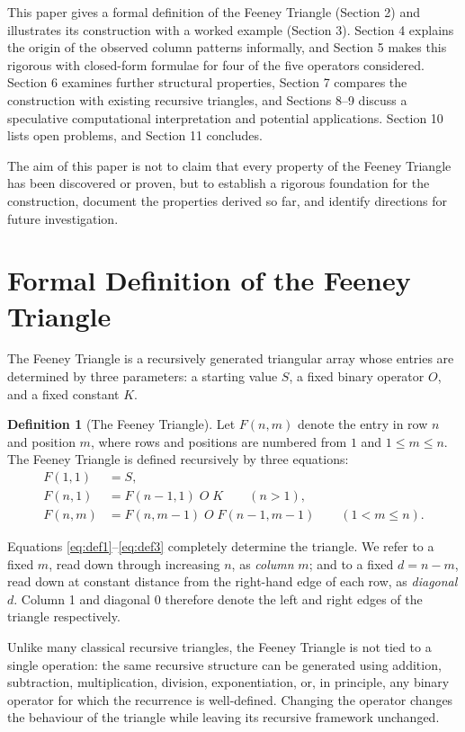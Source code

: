 \documentclass[11pt]{article}
\theoremstyle{definition}
\newtheorem{definition}{Definition}[section]
\begin{document}
This paper gives a formal definition of the Feeney Triangle (Section 2) and illustrates its construction with a worked example (Section 3). Section 4 explains the origin of the observed column patterns informally, and Section 5 makes this rigorous with closed-form formulae for four of the five operators considered. Section 6 examines further structural properties, Section 7 compares the construction with existing recursive triangles, and Sections 8--9 discuss a speculative computational interpretation and potential applications. Section 10 lists open problems, and Section 11 concludes.

The aim of this paper is not to claim that every property of the Feeney Triangle has been discovered or proven, but to establish a rigorous foundation for the construction, document the properties derived so far, and identify directions for future investigation.

\section{Formal Definition of the Feeney Triangle}

The Feeney Triangle is a recursively generated triangular array whose entries are determined by three parameters: a starting value $S$, a fixed binary operator $O$, and a fixed constant $K$.

\begin{definition}[The Feeney Triangle]
Let $F(n,m)$ denote the entry in row $n$ and position $m$, where rows and positions are numbered from $1$ and $1 \le m \le n$. The Feeney Triangle is defined recursively by three equations:
\begin{align}
F(1,1) &= S, \label{eq:def1}\\
F(n,1) &= F(n-1,1) \; O \; K \qquad (n>1), \label{eq:def2}\\
F(n,m) &= F(n,m-1) \; O \; F(n-1,m-1) \qquad (1<m\le n). \label{eq:def3}
\end{align}
\end{definition}

Equations \eqref{eq:def1}--\eqref{eq:def3} completely determine the triangle. We refer to a fixed $m$, read down through increasing $n$, as \emph{column} $m$; and to a fixed $d = n-m$, read down at constant distance from the right-hand edge of each row, as \emph{diagonal} $d$. Column 1 and diagonal 0 therefore denote the left and right edges of the triangle respectively.

Unlike many classical recursive triangles, the Feeney Triangle is not tied to a single operation: the same recursive structure can be generated using addition, subtraction, multiplication, division, exponentiation, or, in principle, any binary operator for which the recurrence is well-defined. Changing the operator changes the behaviour of the triangle while leaving its recursive framework unchanged.
\end{document}
